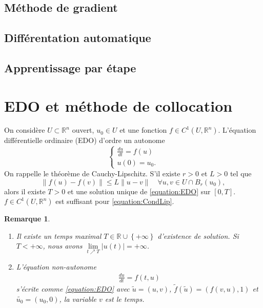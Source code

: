 \documentclass[11pt,a4paper, french]{article}
\newcommand{\R}{\mathbb R}
\newcommand{\abs}[1]{\left|#1\right|}
\newcommand{\norm}[1]{\|#1\|}
\newcommand{\Set}[1]{\left\{#1\right\}}
\newtheorem{remark}[theorem]{Remarque}
\begin{document}
\subsection{Méthode de gradient}\label{subsec:}
%
%
\subsection{Différentation automatique}\label{subsec:}
%
%
\subsection{Apprentissage par étape}\label{subsec:}
%
%
%
\section{EDO et méthode de collocation}\label{sec:}
%
On considère $U\subset \R^n$ ouvert, $u_0\in U$ et une fonction $f\in C^1(U,\R^n)$. L'équation différentielle ordinaire (EDO) d'ordre un autonome
%
\begin{equation}\label{equation:EDO}
\left\{
\begin{aligned}
\frac{du}{dt} = f(u)\\
u(0) = u_0.
\end{aligned}
\right.
\end{equation}
%
On rappelle le théorème de Cauchy-Lipschitz. S'il existe $r>0$ et $L>0$ tel que
%
\begin{equation}\label{equation:CondLip}
\norm{f(u)-f(v)}\le L\norm{u-v}\quad \forall u,v\in U\cap B_r(u_0),
\end{equation}
%
alors il existe $T>0$ et une solution unique de \eqref{equation:EDO} sur $[0,T]$. $f\in C^1(U,\R^n)$ est suffisant pour \eqref{equation:CondLip}.
%
%
\begin{remark}\label{remark:}
\begin{enumerate}
\item Il existe un temps maximal $T\in\R\cup\Set{+\infty}$ d'existence de solution. Si $T<+\infty$, nous avons $\lim\limits_{t\nearrow T}\abs{u(t)}=+\infty$.
\item L'équation non-autonome
\begin{align*}
\frac{du}{dt} = f(t,u)
\end{align*}
 s'écrite comme \eqref{equation:EDO} avec $\widetilde{u} = (u, v)$, $\widetilde{f}(\widetilde{u}) = (f(v,u),1)$ et $\widetilde{u_0}=(u_0,0)$, la variable $v$ est le temps.
\end{enumerate}
\end{remark}
%
\end{document}
